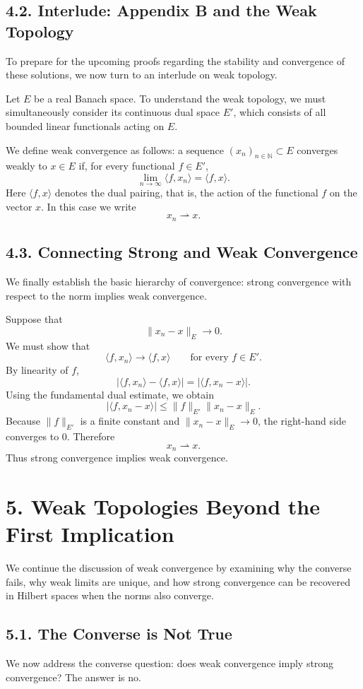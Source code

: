 \documentclass[11pt]{article}
\theoremstyle{definition}
\theoremstyle{remark}
\begin{document}
\subsection*{4.2. Interlude: Appendix B and the Weak Topology}
To prepare for the upcoming proofs regarding the stability and convergence of these solutions, we now turn to an interlude on weak topology.

Let \(E\) be a real Banach space. To understand the weak topology, we must simultaneously consider its continuous dual space \(E'\), which consists of all bounded linear functionals acting on \(E\).

We define weak convergence as follows: a sequence \((x_n)_{n\in\mathbb N}\subset E\) converges weakly to \(x\in E\) if, for every functional \(f\in E'\),
\[
\lim_{n\to\infty}\langle f,x_n\rangle=\langle f,x\rangle.
\]
Here \(\langle f,x\rangle\) denotes the dual pairing, that is, the action of the functional \(f\) on the vector \(x\). In this case we write
\[
x_n\rightharpoonup x.
\]

\subsection*{4.3. Connecting Strong and Weak Convergence}
We finally establish the basic hierarchy of convergence: strong convergence with respect to the norm implies weak convergence.

Suppose that
\[
\|x_n-x\|_E\to 0.
\]
We must show that
\[
\langle f,x_n\rangle\to\langle f,x\rangle
\qquad \text{for every } f\in E'.
\]
By linearity of \(f\),
\[
|\langle f,x_n\rangle-\langle f,x\rangle|
=
|\langle f,x_n-x\rangle|.
\]
Using the fundamental dual estimate, we obtain
\[
|\langle f,x_n-x\rangle|
\le
\|f\|_{E'}\|x_n-x\|_E.
\]
Because \(\|f\|_{E'}\) is a finite constant and \(\|x_n-x\|_E\to 0\), the right-hand side converges to \(0\). Therefore
\[
x_n\rightharpoonup x.
\]
Thus strong convergence implies weak convergence.

\section*{5. Weak Topologies Beyond the First Implication}

We continue the discussion of weak convergence by examining why the converse fails, why weak limits are unique, and how strong convergence can be recovered in Hilbert spaces when the norms also converge.

\subsection*{5.1. The Converse is Not True}
We now address the converse question: does weak convergence imply strong convergence? The answer is no.
\end{document}
